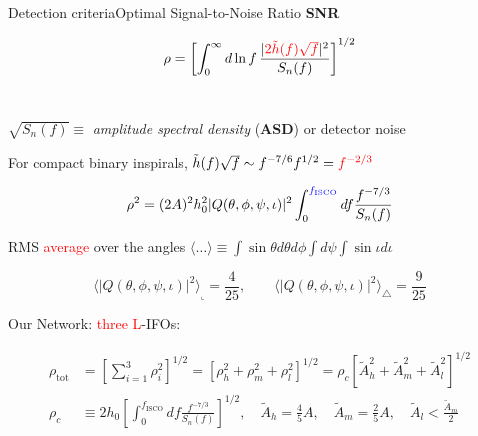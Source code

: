 \documentclass[xcolor=dvipsnames,handout,t]{beamer}
\newcommand{\red}[1]{\textcolor{red}{#1}}
\newcommand{\bl}[1]{\textcolor{blue}{#1}}
\newcommand{\f}{\frac}
\begin{document}
\begin{frame}{Detection criteria}{Optimal Signal-to-Noise Ratio {\bf SNR}}
\vspace{-5mm}
\begin{footnotesize} 
\[
 \rho=\left[ \int_0^\infty d\ln f\, \f{|\red{2\tilde{h}(f)\sqrt{f}}|^2}{S_n(f)}\right]^{1/2} 
\]
\\
\end{footnotesize}
$\sqrt{S_n(f)}\equiv$ {\it amplitude spectral density} ({\bf ASD}) or  detector noise

For compact binary inspirals, $\tilde{h}(f) \sqrt{f} \sim f^{-7/6} f^{1/2} = \red{f^{-2/3}}$
\begin{footnotesize} 
\[
 \rho^2 =  (2A)^2 h_0^2 |Q(\theta,\phi,\psi,\iota)|^2 \int_0^{\bl{f_\text{ISCO}}} df \f{f^{-7/3}}{S_n(f)} 
\]
\end{footnotesize}
%
RMS \red{average} over the angles $ \langle \ldots \rangle \equiv \int \sin\theta d\theta d\phi \int d\psi \int\sin\iota d\iota $
\begin{footnotesize} 
\[
 \langle |Q(\theta,\phi,\psi,\iota)|^2 \rangle_\llcorner = \f{4}{25}, \qquad \langle |Q(\theta,\phi,\psi,\iota)|^2 \rangle_\triangle = \f{9}{25}
\]
\end{footnotesize}
Our Network: \red{three L}-IFOs: 
\begin{footnotesize} 
\begin{align*}
\rho_\text{tot} &= \left[{\sum_{i=1}^3 \rho^2_i}\right]^{1/2} =\left[ \rho_h^2 + \rho_m^2 + \rho^2_l \right]^{1/2} 
	= \boxed{\rho_c\left[\tilde{A}_h^2 + \tilde{A}_m^2 + \tilde{A}_l^2 \right]^{1/2}}\\
\rho_c &\equiv 2 h_0 \left[ \int_0^{{f_\text{ISCO}}} df \f{f^{-7/3}}{S_n(f)}  \right]^{1/2}, \quad \tilde{A}_h = \tfrac{4}{5}A, \quad \tilde{A}_m =\tfrac{2}{5}A, \quad \tilde{A}_l  < \tfrac{\tilde{A}_m}{2}
\end{align*}
\end{footnotesize}
%
%
% 
\end{frame}
\end{document}
